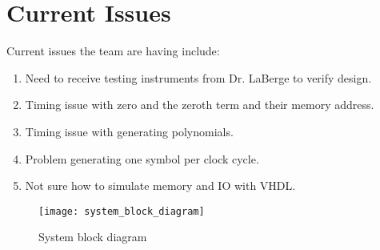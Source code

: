 \documentclass[paper=usletter, fontsize=12pt]{article}
\begin{document}
    \section{Current Issues} Current issues the team are having include: 
	
	\begin{enumerate}[label=\alph*)]
		\item Need to receive testing instruments from Dr. LaBerge to verify design. 
		\item Timing issue with zero and the zeroth term and their memory address.
		\item Timing issue with generating polynomials.		
		\item Problem generating one symbol per clock cycle.
		\item Not sure how to simulate memory and IO with VHDL.
	\end{enumerate}
	
  	\begin{figure}[h!]
  		
  		\texttt{[image: system\_block\_diagram]}
  		\caption{System block diagram}
  	\end{figure}
   
   
\end{document}

